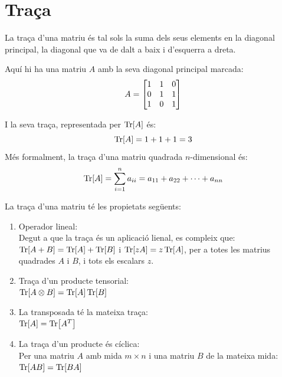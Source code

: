 

\section{Traça}
La traça d'una matriu és tal sols la suma dels seus elements en la diagonal principal, la diagonal que va de dalt a baix i d'esquerra a dreta.

Aquí hi ha una matriu $A$ amb la seva diagonal principal marcada:
$$A = 
	\begin{bmatrix}
		\tikzmarktrace{top}{1} & \tikzmarktrace{top2}{1} & 0 \\
		0 & 1 & \tikzmarktrace{bottom2}{1} \\
		\tikzmarktrace{end}{1} & 0 & \tikzmarktrace{bottom}{1}\\
	\end{bmatrix}
$$

I la seva traça, representada per $\Tr[A]$ és:
$$
\Tr[A] = 1 + 1 + 1 = 3
$$
Més formalment, la traça d'una matriu quadrada $n$-dimensional és:
$$
\Tr[A] = \sum_{i=1}^{n} a_{ii} = a_{11} + a_{22} + \cdots + a_{nn}
$$

La traça d'una matriu té les propietats següents:
\begin{enumerate}
	\item Operador lineal: \\
	Degut a que la traça és un aplicació lienal, es compleix que:\\
	$\Tr[A+B] = \Tr[A] + \Tr[B]$ i $\Tr[zA] = z \Tr[A]$, per a totes les matrius quadrades $A$ i $B$, i tots els escalars $z$.
	\item Traça d'un producte tensorial: \\
	$\Tr[A \otimes B] = \Tr[A]\Tr[B]$
	\item La transposada té la mateixa traça: \\
	$\Tr[A]=\Tr[A^T]$
	\item La traça d'un producte és cíclica: \\
	Per una matriu $A$ amb mida $m \times n$ i una matriu $B$ de la mateixa mida:\\
	$\Tr[AB]=\Tr[BA]$
\end{enumerate}

